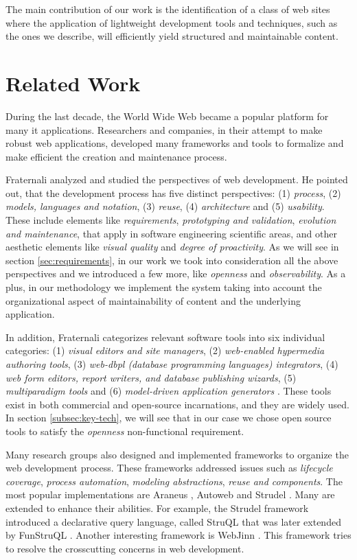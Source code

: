 \documentclass{article}
\begin{document}
The main contribution of our work is the identification of
a class of web sites where the application of lightweight
development tools and techniques, such as the ones we describe,
will efficiently yield structured and maintainable content.

\section{Related Work}
\label{sec:related}

During the last decade, the World Wide Web became a popular platform for many {\sc it} applications.
Researchers and companies, in their attempt to make robust web applications,
developed many frameworks and tools to formalize and make efficient the creation and maintenance process.

Fraternali \cite{FRA99} analyzed and studied the perspectives of
web development. He pointed out, that the development process has
five distinct perspectives: (1) {\em process}, (2) {\em models, languages and notation}, (3) {\em reuse}, (4) {\em architecture} and (5) {\em usability}.
These include elements like {\em requirements}, {\em  prototyping and validation}, {\em evolution and maintenance}, that apply in
software engineering scientific areas, and other aesthetic elements like {\em visual quality} and {\em degree of proactivity}.
As we will see in section \ref{sec:requirements}, in our work we took into consideration all the above perspectives and we introduced a few more, like {\em openness}
and {\em observability}.
As a plus, in our methodology we implement the system taking into account the organizational aspect of maintainability of content and the underlying application.

In addition, Fraternali categorizes relevant software tools into six individual categories: (1) {\em visual editors and site managers},
 (2) {\em web-enabled hypermedia authoring tools}, (3) {\em web-{\sc dbpl} (database programming languages) integrators}, (4) {\em web form editors, report writers,
 and database publishing wizards},
 (5) {\em multiparadigm tools} and (6) {\em model-driven application generators} \cite{FRA99}.
 These tools exist in both commercial and open-source incarnations,
and they are widely used.
 In section \ref{subsec:key-tech}, we will see that in our case we chose open source tools to satisfy the {\em openness} non-functional requirement.
 
Many research groups also designed and implemented frameworks to organize the web development process. These frameworks addressed issues
such as {\em lifecycle coverage}, {\em process automation}, {\em modeling abstractions}, {\em reuse and components}. The most popular implementations are 
Araneus \cite{MAM03}, 
Autoweb \cite{FP00} and Strudel \cite{FFLS00}. Many are extended to enhance their abilities. For example, the Strudel
framework introduced a declarative query language, called StruQL that was later extended by FunStruQL \cite{FST99}. Another interesting
framework is WebJinn \cite{KL03}. This framework tries to resolve the crosscutting concerns in web development.
\end{document}
